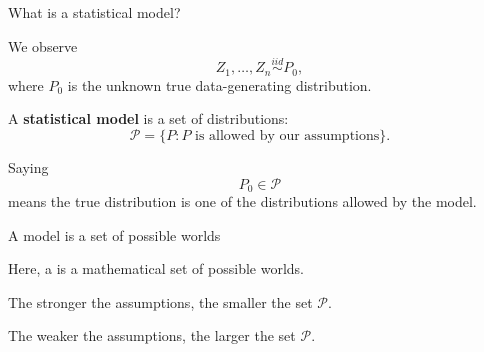 \documentclass[xcolor={table}, handout]{beamer}
\begin{document}
\note{
\scriptsize \singlespacing

}
\begin{frame}{What is a statistical model?}

\begin{wideitemize}
\item We observe
\[
Z_1,\dots,Z_n \overset{iid}{\sim} P_0,
\]
where $P_0$ is the unknown true data-generating distribution.\pause
\item A \textbf{statistical model} is a set of distributions:
\[
\mathcal{P}=\{P: P \text{ is allowed by our assumptions}\}.
\]\pause
\item Saying
\[
P_0\in\mathcal{P}
\]
means the true distribution is one of the distributions allowed by the model.
\end{wideitemize}

\end{frame}

\note{
\scriptsize \singlespacing

}
\begin{frame}{A model is a set of possible worlds}

\begin{wideitemize}
\item Here, a is a mathematical set of possible worlds.\pause
\item The stronger the assumptions, the smaller the set $\mathcal{P}$.\pause
\item The weaker the assumptions, the larger the set $\mathcal{P}$.
\end{wideitemize}

\end{frame}
\end{document}
